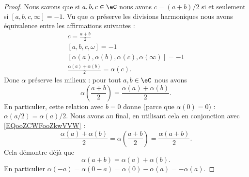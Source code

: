 \begin{proof}
	Nous savons que si \( a,b,c\in \eC\) nous avons \( c=(a+b)/2\) si et seulement si \( [a,b,c,\infty]=-1\). Vu que \( \alpha\) préserve les divisions harmoniques nous avons équivalence entre les affirmations suivantes :
	\begin{subequations}
		\begin{align}
			c=\frac{ a+b }{ 2 }                               \\
			[a,b,c,\omega]=-1                                 \\
			[\alpha(a),\alpha(b),\alpha(c),\alpha(\infty)]=-1 \\
			\frac{ \alpha(a)+\alpha(b) }{2}=\alpha(c).
		\end{align}
	\end{subequations}
	Donc \( \alpha\) préserve les milieux : pour tout \( a,b\in \eC\) nous avons
	\begin{equation}        \label{EQooZCWFooZkwVVW}
		\alpha\left( \frac{ a+b }{2} \right)=\frac{ \alpha(a)+\alpha(b) }{2}.
	\end{equation}
	En particulier, cette relation avec \( b=0\) donne (parce que \( \alpha(0)=0\)) : \( \alpha(a/2)=\alpha(a)/2\). Nous avons au final, en utilisant cela en conjonction avec \eqref{EQooZCWFooZkwVVW} :
	\begin{equation}
		\frac{ \alpha(a)+\alpha(b) }{2}=\alpha\left( \frac{ a+b }{2} \right)=\frac{ \alpha(a+b) }{ 2 }.
	\end{equation}
	Cela démontre déjà que
	\begin{equation}
		\alpha(a+b)=\alpha(a)+\alpha(b).
	\end{equation}
	En particulier \( \alpha(-a)=\alpha(0-a)=\alpha(0)-\alpha(a)=-\alpha(a)\).


\end{proof}
